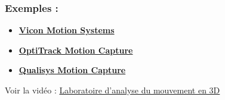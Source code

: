 \subsubsection{Exemples :}
\begin{itemize}
  \item \href{https://www.vicon.com/}{\textbf{Vicon Motion Systems}}
  \item \href{https://optitrack.com/}{\textbf{OptiTrack Motion Capture}}
  \item \href{https://www.qualisys.com/}{\textbf{Qualisys Motion Capture}}
\end{itemize}
Voir la vidéo : \href{https://www.youtube.com/watch?v=MTi32qJB_vo}{Laboratoire d'analyse du mouvement en 3D}
